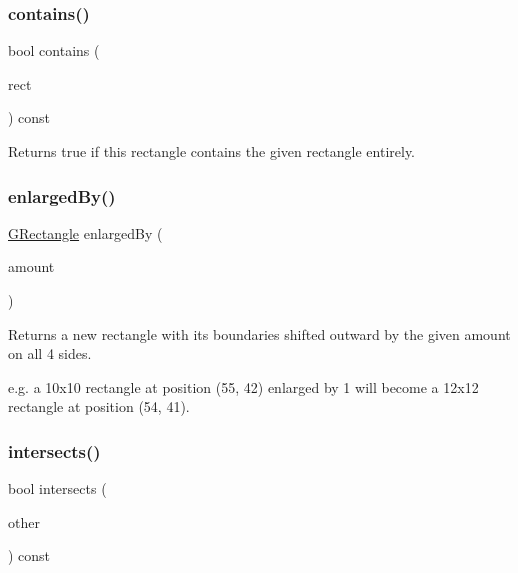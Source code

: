 \subsubsection{\texorpdfstring{contains()}{contains()}\hspace{0.1cm}{\footnotesize\ttfamily [3/3]}}
{\footnotesize\ttfamily bool contains (\begin{DoxyParamCaption}\item[{const \mbox{\hyperlink{structGRectangle}{G\+Rectangle}} \&}]{rect }\end{DoxyParamCaption}) const}



Returns {\ttfamily true} if this rectangle contains the given rectangle entirely. 

\mbox{\label{structGRectangle_adddb08ead701a5144949ca673a44292c}} 
\subsubsection{\texorpdfstring{enlarged\+By()}{enlargedBy()}}
{\footnotesize\ttfamily \mbox{\hyperlink{structGRectangle}{G\+Rectangle}} enlarged\+By (\begin{DoxyParamCaption}\item[{double}]{amount }\end{DoxyParamCaption})}



Returns a new rectangle with its boundaries shifted outward by the given amount on all 4 sides. 

e.\+g. a 10x10 rectangle at position (55, 42) enlarged by 1 will become a 12x12 rectangle at position (54, 41). \mbox{\label{structGRectangle_aea079d10c5a74c6e7c83b44a44357b42}} 
\subsubsection{\texorpdfstring{intersects()}{intersects()}}
{\footnotesize\ttfamily bool intersects (\begin{DoxyParamCaption}\item[{const \mbox{\hyperlink{structGRectangle}{G\+Rectangle}} \&}]{other }\end{DoxyParamCaption}) const}



